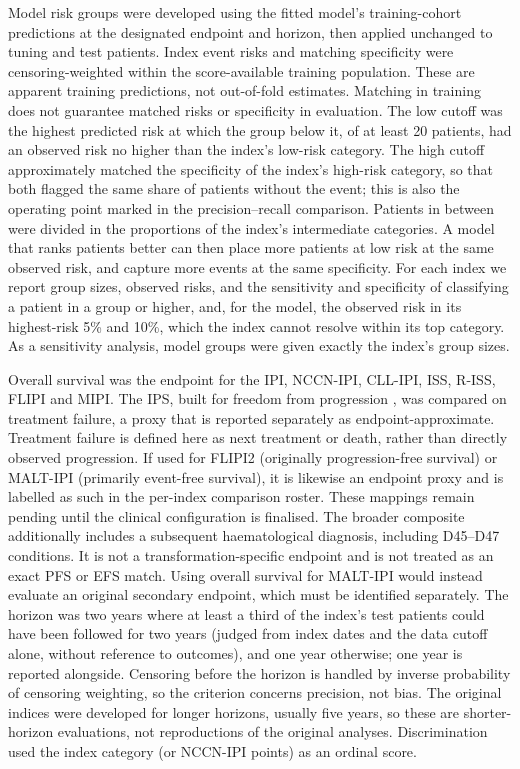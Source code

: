 Model risk groups were developed using the fitted model's training-cohort
predictions at the designated endpoint and horizon, then applied unchanged
to tuning and test patients. Index event risks and matching specificity were
censoring-weighted within the score-available training population. These are
apparent training predictions, not out-of-fold estimates. Matching in training
does not guarantee matched risks or specificity in evaluation. The low
cutoff was the highest predicted risk at which the group below it, of at least
20 patients, had an observed risk no higher than the index's low-risk category.
The high cutoff approximately matched the specificity of the index's high-risk category, so
that both flagged the same share of patients without the event; this is also
the operating point marked in the precision--recall comparison. Patients in
between were divided in the proportions of the index's intermediate categories.
A model that ranks patients better can then place more patients at low risk at
the same observed risk, and capture more events at the same specificity. For
each index we report group sizes, observed risks, and the sensitivity and
specificity of classifying a patient in a group or higher, and, for the model,
the observed risk in its highest-risk 5\% and 10\%, which the index cannot
resolve within its top category. As a sensitivity analysis, model groups were
given exactly the index's group sizes.

Overall survival was the endpoint for the IPI, NCCN-IPI, CLL-IPI, ISS, R-ISS,
FLIPI and MIPI. The IPS, built for freedom from progression
\citep{hasenclever1998ips}, was compared on treatment failure, a proxy that is
reported separately as endpoint-approximate. Treatment failure is defined here
as next treatment or death, rather than directly observed progression. If used
for FLIPI2 (originally progression-free survival) or MALT-IPI (primarily
event-free survival), it is likewise an endpoint proxy and is labelled as such
in the per-index comparison roster. These mappings remain pending until the
clinical configuration is finalised. The broader composite additionally includes
a subsequent haematological diagnosis, including D45--D47 conditions. It is
not a transformation-specific endpoint and is not treated as an exact PFS or
EFS match. Using overall survival for MALT-IPI would instead evaluate an
original secondary endpoint, which must be identified separately. The horizon was two years where at
least a third of the index's test patients could have been followed for two
years (judged from index dates and the data cutoff alone, without reference to
outcomes), and one year otherwise; one year is reported alongside. Censoring
before the horizon is handled by inverse probability of censoring weighting, so
the criterion concerns precision, not bias. The original
indices were developed for longer horizons, usually five years, so these are
shorter-horizon evaluations, not reproductions of the original analyses.
Discrimination used the index category (or NCCN-IPI points) as an ordinal
score.


